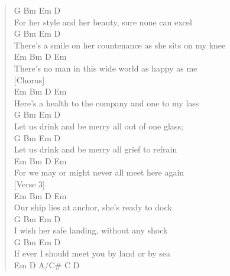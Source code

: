 \documentclass[11pt]{article}
\begin{document}
\begin{verse}
\hspace*{8em}G         Bm  Em                      D\\
For her style and her beauty, sure none can excel\\
\hspace*{10em}G        Bm  Em                            D\\
There's a smile on her countenance as she sits on my knee\\
\hspace*{11em}Em          Bm            D        Em\\
There's no man in this wide world as happy as me\\
\vspace*{1em}
\vspace*{1em}
[Chorus]\\
\hspace*{9em}Em            Bm          D         Em\\
Here's a health to the company and one to my lass\\
\hspace*{7em}G         Bm Em                   D\\
Let us drink and be merry all out of one glass;\\
\hspace*{7em}G         Bm Em                   D\\
Let us drink and be merry all grief to refrain\\
\hspace*{7em}Em           Bm        D          Em\\
For we may or might never all meet here again\\
\vspace*{1em}
\vspace*{1em}
[Verse 3]\\
\hspace*{4em}Em           Bm            D        Em\\
Our ship lies at anchor, she's ready to dock\\
\hspace*{2em}G        Bm   Em                   D\\
I wish her safe landing, without any shock\\
\hspace*{3em}G    Bm       Em                     D\\
If ever I should meet you by land or by sea\\
\hspace*{7em}Em       D           A/C\#        C   D\\

\end{verse}
\end{document}
